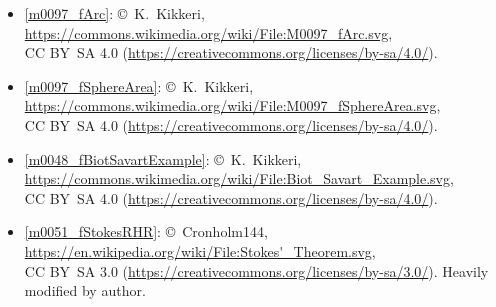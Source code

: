 \begin{itemize}
\item[Fig.] \label{m0097_fArc_Credit}
  \ref{m0097_fArc}:
  \copyright~K.\ Kikkeri, 
  \url{https://commons.wikimedia.org/wiki/File:M0097_fArc.svg},\\ 
  CC BY~SA 4.0 (\url{https://creativecommons.org/licenses/by-sa/4.0/}).

\item[Fig.] \label{m0097_fSphereArea_Credit}
  \ref{m0097_fSphereArea}:
  \copyright~K.\ Kikkeri, 
  \url{https://commons.wikimedia.org/wiki/File:M0097_fSphereArea.svg},\\ 
  CC BY~SA 4.0 (\url{https://creativecommons.org/licenses/by-sa/4.0/}).

\item[Fig.] \label{m0048_fBiotSavartExample_Credit}
  \ref{m0048_fBiotSavartExample}:
  \copyright~K.\ Kikkeri, 
  \url{https://commons.wikimedia.org/wiki/File:Biot_Savart_Example.svg},\\ 
  CC BY~SA 4.0 (\url{https://creativecommons.org/licenses/by-sa/4.0/}).

\item[Fig.] \label{m0051_fStokesRHR_Credit}
  \ref{m0051_fStokesRHR}:
  \copyright~Cronholm144, 
  \url{https://en.wikipedia.org/wiki/File:Stokes'_Theorem.svg},\\ 
  CC BY~SA 3.0 (\url{https://creativecommons.org/licenses/by-sa/3.0/}).
  Heavily modified by author.

\end{itemize}

\twocolumn
